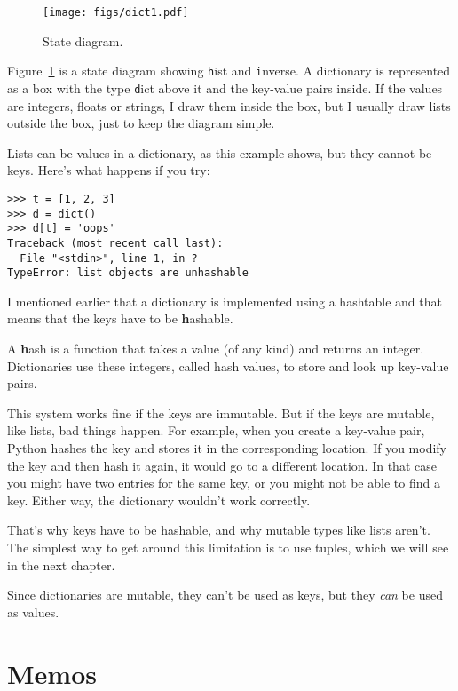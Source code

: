 \documentclass[
DIV=11,
fontsize=12,
twoside,
headinclude=false,
titlepage=firstiscover,
abstract=true,
headsepline=true,
footsepline=true,
chapterprefix=true, %
headings=big,
bibliography=totoc,%
captions=tableheading
]{scrbook}
\theoremstyle{definition}
\begin{document}
\begin{figure}
\centerline
{\texttt{[image: figs/dict1.pdf]}}
\caption{State diagram.}
\label{fig.dict1}
\end{figure}

Figure~\ref{fig.dict1} is a state diagram showing {\texttt hist} and {\texttt inverse}.
A dictionary is represented as a box with the type {\texttt dict} above it
and the key-value pairs inside.  If the values are integers, floats or
strings, I draw them inside the box, but I usually draw lists
outside the box, just to keep the diagram simple.

Lists can be values in a dictionary, as this example shows, but they
cannot be keys.  Here's what happens if you try:


\begin{lstlisting}
>>> t = [1, 2, 3]
>>> d = dict()
>>> d[t] = 'oops'
Traceback (most recent call last):
  File "<stdin>", line 1, in ?
TypeError: list objects are unhashable
\end{lstlisting}
%
I mentioned earlier that a dictionary is implemented using
a hashtable and that means that the keys have to be {\textbf hashable}.

A {\textbf hash} is a function that takes a value (of any kind)
and returns an integer.  Dictionaries use these integers,
called hash values, to store and look up key-value pairs.

This system works fine if the keys are immutable.  But if the
keys are mutable, like lists, bad things happen.  For example,
when you create a key-value pair, Python hashes the key and 
stores it in the corresponding location.  If you modify the
key and then hash it again, it would go to a different location.
In that case you might have two entries for the same key,
or you might not be able to find a key.  Either way, the
dictionary wouldn't work correctly.

That's why keys have to be hashable, and why mutable types like
lists aren't.  The simplest way to get around this limitation is to
use tuples, which we will see in the next chapter.

Since dictionaries are mutable, they can't be used as keys,
but they {\em can} be used as values.


\section{Memos}
\label{memoize}
\end{document}
